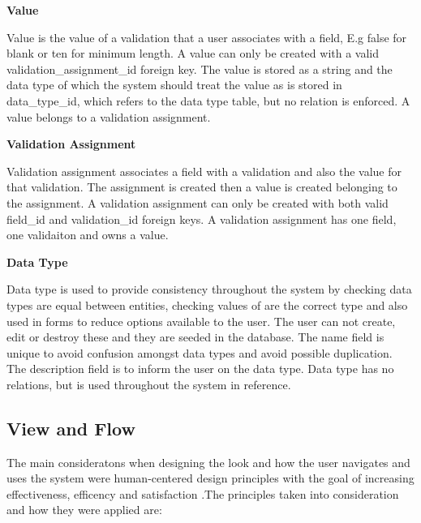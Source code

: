 \documentclass[a4paper,12pt]{article}
\begin{document}
\par \textbf{Value}
\par Value is the value of a validation that a user associates with a field, E.g false for blank or ten for minimum length. A value can only be created with a valid validation\_assignment\_id foreign key. The value is stored as a string and the data type of which the system should treat the value as is stored in data\_type\_id, which refers to the data type table, but no relation is enforced. A value belongs to a validation assignment.

\par \textbf{Validation Assignment}
\par Validation assignment associates a field with a validation and also the value for that validation. The assignment is created then a value is created belonging to the assignment. A validation assignment can only be created with both valid field\_id and validation\_id foreign keys. A validation assignment has one field, one validaiton and owns a value.

\par \textbf{Data Type}
\par Data type is used to provide consistency throughout the system by checking data types are equal between entities, checking values of are the correct type and also used in forms to reduce options available to the user. The user can not create, edit or destroy these and they are seeded in the database. The name field is unique to avoid confusion amongst data types and avoid possible duplication. The description field is to inform the user on the data type. Data  type has no relations, but is used throughout the system in reference.


\subsection{View and Flow}
\par The main consideratons when designing the look and how the user navigates and uses the system were human-centered design principles with the goal of increasing effectiveness, efficency and satisfaction\cite{maguire2001methods} .The principles taken into consideration and how they were applied are\cite{abras2004user}:
\end{document}

